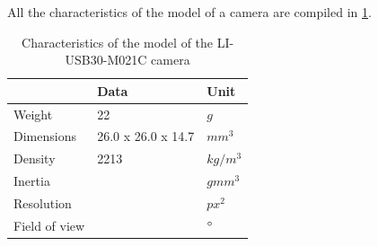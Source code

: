 All the characteristics of the model of a camera are compiled in \cref{table:cam_specs}.

\begin{table}[htp]
\center
\begin{tabularx}{\textwidth}{@{}X X X @{}}
\toprule
 & \textbf{Data} & \textbf{Unit}\\ 
\midrule
Weight & 22 & $g$\\
Dimensions & 26.0 x 26.0 x 14.7 & $mm^3$\\
Density & 2213 & $kg/m^3$\\
Inertia & & $gmm^3$\\
Resolution &  & $px^2$\\
Field of view & & $\degree$\\
\bottomrule
\end{tabularx}
\caption{Characteristics of the model of the LI-USB30-M021C camera}
\label{table:cam_specs}
\end{table}

